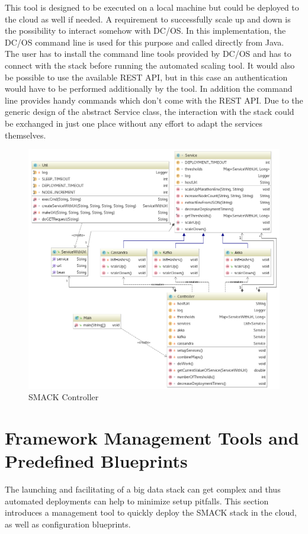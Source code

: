 This tool is designed to be executed on a local machine but could be deployed to the cloud as well if needed.
A requirement to successfully scale up and down is the possibility to interact somehow with DC/OS.
In this implementation, the DC/OS command line is used for this purpose and called directly from Java.\\
The user has to install the command line tools provided by DC/OS and has to connect with the stack before running the automated scaling tool.
It would also be possible to use the available REST API, but in this case an authentication would have to be performed additionally by the tool.
In addition the command line provides handy commands which don't come with the REST API.
Due to the generic design of the abstract Service class, the interaction with the stack could be exchanged in just one place without any effort to adapt the services themselves.

\begin{figure}[!htbp]
  \centering
  \includegraphics[keepaspectratio=true,scale=0.45]{img/smack_controller_uml}
    \caption{SMACK Controller}
    \label{fig:smack_controller_uml}
\end{figure}



\section{Framework Management Tools and Predefined Blueprints}
The launching and facilitating of a big data stack can get complex and thus automated deployments can help to minimize setup pitfalls.
This section introduces a management tool to quickly deploy the SMACK stack in the cloud, as well as configuration blueprints.

